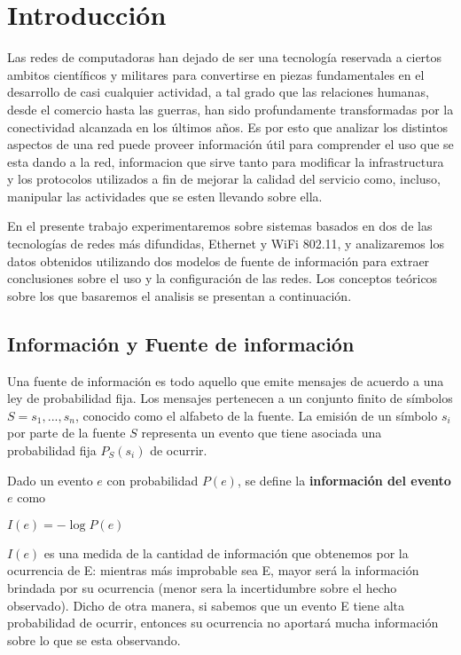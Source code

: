 \section{Introducción}

Las redes de computadoras han dejado de ser 
una tecnología reservada a ciertos ambitos científicos y militares para convertirse
en piezas fundamentales en el desarrollo de casi cualquier actividad, a tal grado que las relaciones humanas, 
desde el comercio hasta las guerras, han sido profundamente transformadas por la conectividad
alcanzada en los últimos años.  
Es por esto que analizar los distintos aspectos de una red
puede proveer información útil para comprender el uso que se esta dando a la red, informacion que sirve tanto para
modificar la infrastructura y los protocolos
utilizados a fin de mejorar la calidad del servicio como, incluso,  manipular las actividades que se esten llevando sobre ella.


En el presente trabajo experimentaremos sobre sistemas basados en dos de las tecnologías de redes más difundidas, Ethernet y WiFi 802.11, y analizaremos los datos obtenidos utilizando dos modelos de fuente de información para extraer conclusiones sobre el uso y la configuración de las redes. Los conceptos teóricos sobre los que basaremos el analisis se presentan a continuación.


\subsection{Información y Fuente de información}

Una fuente de información es todo aquello que emite mensajes de acuerdo a una ley de probabilidad fija. Los mensajes pertenecen a un conjunto finito de símbolos $S={s_{1},...,s_{n}}$, conocido como el alfabeto de la fuente. La emisión de un símbolo $s_i$ por parte de la fuente $S$ representa un evento que tiene asociada una probabilidad fija $P_S(s_i)$ de ocurrir. 

Dado un evento $e$ con probabilidad $P(e)$, se define la \textbf{información del evento $e$} como

\begin{center}
$I(e)=-\log{P(e)}$ 
\end{center}

$I(e)$ es una medida de la cantidad de información que obtenemos por la ocurrencia de E: mientras más improbable sea E, mayor será la información brindada por su ocurrencia (menor sera la incertidumbre sobre el hecho observado). Dicho de otra manera, si sabemos que un evento E tiene alta probabilidad de ocurrir, entonces su ocurrencia no aportará mucha información sobre lo que se esta observando.



